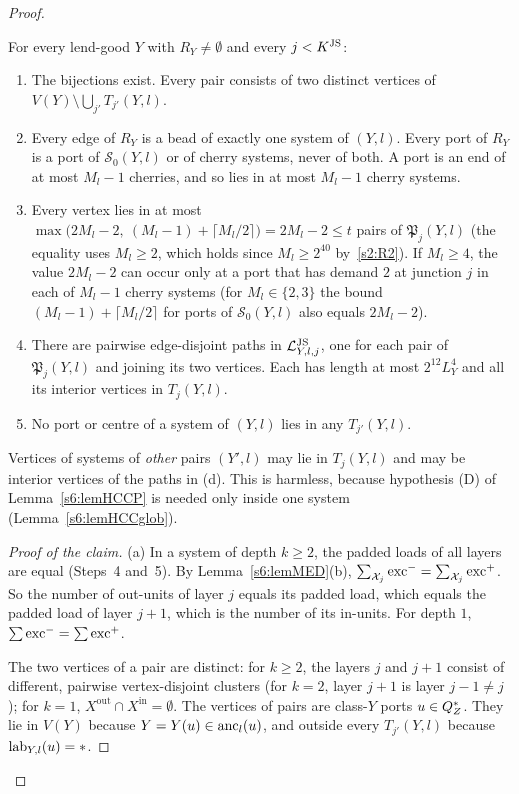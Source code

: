 \begin{proof}
\begin{claim}
For every lend-good $Y$ with $R_Y\neq\emptyset$ and every $j<K^{\mathrm{JS}}$:
\begin{enumerate}
\item[(a)] The bijections exist. Every pair consists of two distinct vertices of $V(Y)\setminus\bigcup_{j'}T_{j'}(Y,l)$.
\item[(b)] Every edge of $R_Y$ is a bead of exactly one system of $(Y,l)$. Every port of $R_Y$ is a port of $\mathcal S_0(Y,l)$ or of cherry systems, never of both. A port is an end of at most $M_l-1$ cherries, and so lies in at most $M_l-1$ cherry systems.
\item[(c)] Every vertex lies in at most $\max\bigl(2M_l-2,\ (M_l-1)+\lceil M_l/2\rceil\bigr)=2M_l-2\le t$ pairs of $\mathfrak P_j(Y,l)$ (the equality uses $M_l\ge2$, which holds since $M_l\ge2^{40}$ by~\ref{s2:R2}). If $M_l\ge4$, the value $2M_l-2$ can occur only at a port that has demand $2$ at junction $j$ in each of $M_l-1$ cherry systems (for $M_l\in\{2,3\}$ the bound $(M_l-1)+\lceil M_l/2\rceil$ for ports of $\mathcal S_0(Y,l)$ also equals $2M_l-2$).
\item[(d)] There are pairwise edge-disjoint paths in $\mathcal{L}^{\mathrm{JS}}_{Y,l,j}$, one for each pair of $\mathfrak P_j(Y,l)$ and joining its two vertices. Each has length at most $2^{12}L_Y^4$ and all its interior vertices in $T_j(Y,l)$.
\item[(e)] No port or centre of a system of $(Y,l)$ lies in any $T_{j'}(Y,l)$.
\end{enumerate}
\end{claim}
Vertices of systems of \emph{other} pairs $(Y',l)$ may lie in $T_j(Y,l)$ and may be interior vertices of the paths in (d). This is harmless, because hypothesis (D) of Lemma~\ref{s6:lemHCCP} is needed only inside one system (Lemma~\ref{s6:lemHCCglob}).

\begin{proof}[Proof of the claim]
(a) In a system of depth $k\ge2$, the padded loads of all layers are equal (Steps~4 and~5). By Lemma~\ref{s6:lemMED}(b), $\sum_{\mathcal{X}_j}\mathrm{exc}^-=\sum_{\mathcal{X}_j}\mathrm{exc}^+$. So the number of out-units of layer $j$ equals its padded load, which equals the padded load of layer $j+1$, which is the number of its in-units. For depth $1$, $\sum\mathrm{exc}^-=\sum\mathrm{exc}^+$.

The two vertices of a pair are distinct: for $k\ge2$, the layers $j$ and $j+1$ consist of different, pairwise vertex-disjoint clusters (for $k=2$, layer $j+1$ is layer $j-1\neq j$); for $k=1$, $X^{\mathrm{out}}\cap X^{\mathrm{in}}=\emptyset$. The vertices of pairs are class-$Y$ ports $u\in Q^{*}_Z$. They lie in $V(Y)$ because $Y=Y(u)\in\mathrm{anc}_l(u)$, and outside every $T_{j'}(Y,l)$ because $\mathrm{lab}_{Y,l}(u)=*$.


\end{proof}
\end{proof}
